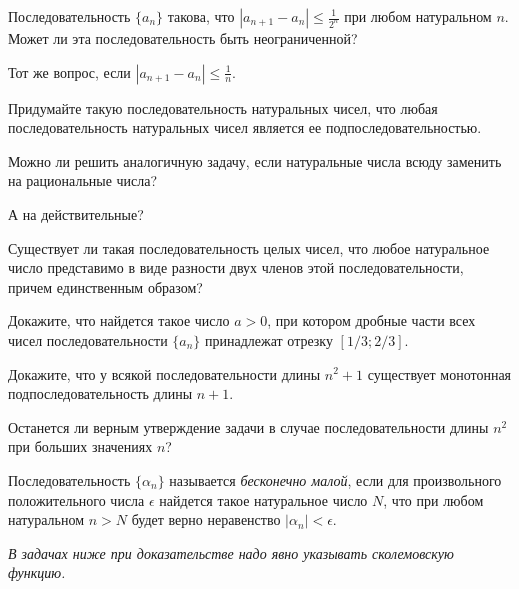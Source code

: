 \documentclass[a4paper, 12pt, num=25]{listok}
\begin{document}
\begin{problem}
\begin{probparts}
	\item Последовательность $\{a_n\}$ такова, что $|a_{n+1} - a_n| \le \frac1{2^n}$ при любом натуральном $n$.
	Может ли эта последовательность быть неограниченной?
	\item Тот же вопрос, если $|a_{n+1} - a_n| \le \frac1n$.
\end{probparts}
\end{problem}
\begin{problem}
\begin{probparts}
	\item Придумайте такую последовательность натуральных чисел, что любая последовательность натуральных чисел является ее подпоследовательностью.
	\item Можно ли решить аналогичную задачу, если натуральные числа всюду заменить на рациональные числа?
	\item А на действительные?
\end{probparts}
\end{problem}
\begin{problem}
	Существует ли такая последовательность целых чисел, что любое натуральное число представимо в виде разности двух членов этой последовательности,
	причем единственным образом?
\end{problem}
\begin{problem}
	Докажите, что найдется такое число $a > 0$,
	при котором дробные части всех чисел последовательности $\{a_n\}$ принадлежат отрезку $[1/3; 2/3]$.
\end{problem}
\begin{problem}
\begin{probparts}
	\item Докажите, что у всякой последовательности длины $n^2 + 1$ существует монотонная подпоследовательность длины $n + 1$.
	\item Останется ли верным утверждение задачи в случае последовательности длины $n^2$ при больших значениях $n$?
\end{probparts}
\end{problem}
\begin{definition}
	Последовательность $\{\alpha_n\}$ называется \textit{бесконечно малой}, если для произвольного положительного числа $\epsilon$
	найдется такое натуральное число $N$, что при любом натуральном $n > N$ будет верно неравенство $|\alpha_n| < \epsilon$.
\end{definition}
\begin{center}
	\textit{В задачах ниже при доказательстве надо явно указывать сколемовскую функцию.}
\end{center}
\end{document}
